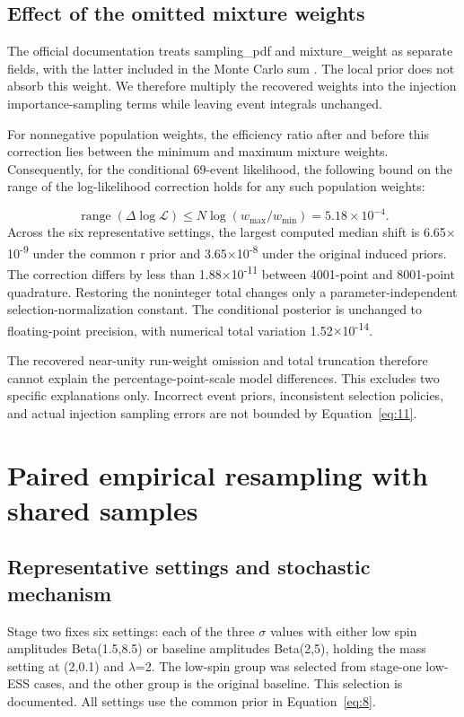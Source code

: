 \documentclass[a4paper,11pt]{article}
\begin{document}
\subsection{Effect of the omitted mixture weights}\label{sec:5.3}
The official documentation treats sampling\_pdf and mixture\_weight as separate fields, with the latter included in the Monte Carlo sum \cite{ref8,ref9}. The local prior does not absorb this weight. We therefore multiply the recovered weights into the injection importance-sampling terms while leaving event integrals unchanged.

For nonnegative population weights, the efficiency ratio after and before this correction lies between the minimum and maximum mixture weights. Consequently, for the conditional 69-event likelihood, the following bound on the range of the log-likelihood correction holds for any such population weights:

\begin{equation}\label{eq:11}
\operatorname{range}(\Delta\log\mathcal L)\leq N\log(w_{\max}/w_{\min})=5.18\times10^{-4}.
\end{equation}
Across the six representative settings, the largest computed median shift is 6.65\(\times\)10\textsuperscript{-9} under the common r prior and 3.65\(\times\)10\textsuperscript{-8} under the original induced priors. The correction differs by less than 1.88\(\times\)10\textsuperscript{-11} between 4001-point and 8001-point quadrature. Restoring the noninteger total changes only a parameter-independent selection-normalization constant. The conditional posterior is unchanged to floating-point precision, with numerical total variation 1.52\(\times\)10\textsuperscript{-14}.

The recovered near-unity run-weight omission and total truncation therefore cannot explain the percentage-point-scale model differences. This excludes two specific explanations only. Incorrect event priors, inconsistent selection policies, and actual injection sampling errors are not bounded by Equation~\eqref{eq:11}.

\FloatBarrier
\section{Paired empirical resampling with shared samples}\label{sec:6}
\subsection{Representative settings and stochastic mechanism}\label{sec:6.1}
Stage two fixes six settings: each of the three \(\sigma\) values with either low spin amplitudes Beta(1.5,8.5) or baseline amplitudes Beta(2,5), holding the mass setting at (2,0.1) and \(\lambda\)=2. The low-spin group was selected from stage-one low-ESS cases, and the other group is the original baseline. This selection is documented. All settings use the common prior in Equation~\eqref{eq:8}.
\end{document}
